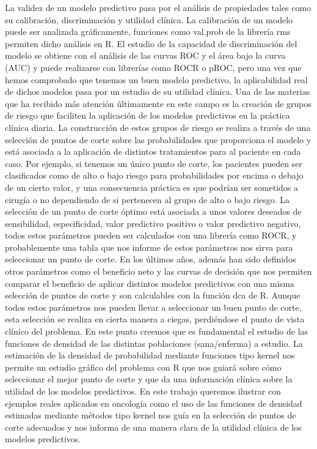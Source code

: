 La validez de un modelo predictivo pasa por el análisis de propiedades tales como su calibración, discriminación y utilidad clínica. 
La calibración de un modelo puede ser analizada gráficamente, funciones como val.prob  de la librería rms permiten dicho análisis en R. El estudio de la capacidad de discriminación del modelo se obtiene con el análisis de las curvas ROC y el área bajo la curva (AUC)  y puede realizarse con  librerías como ROCR o pROC, pero una vez que hemos comprobado que tenemos un buen modelo predictivo, la aplicabilidad real de dichos modelos pasa por un estudio de su utilidad clínica.
Una de las materias que ha recibido más atención últimamente en este campo es la creación de grupos de riesgo que faciliten la aplicación de los modelos predictivos  en la práctica clínica diaria. La construcción de estos grupos de riesgo se realiza a través de una selección de puntos de corte sobre las probabilidades que proporciona el modelo y está asociada a la aplicación de distintos tratamientos para al paciente en cada caso. Por ejemplo, si tenemos un único punto de corte, los pacientes pueden ser clasificados como de alto o bajo riesgo para probabilidades por encima o debajo de un cierto valor, y una consecuencia práctica es que podrían ser sometidos a cirugía o no dependiendo de si pertenecen al grupo de alto o bajo riesgo.  
La selección de un punto de corte óptimo está asociada a unos valores deseados de sensibilidad, especificidad, valor predictivo positivo o valor predictivo negativo, todos estos parámetros pueden ser calculados con una librería como ROCR, y probablemente una tabla que nos informe de estos parámetros nos sirva para seleccionar un punto de corte.  En los últimos años, además han sido definidos otros parámetros como  el beneficio neto y las curvas de decisión que nos permiten comparar el beneficio de aplicar distintos modelos predictivos con una misma selección de puntos de corte y son calculables con la función dca de R.
Aunque todos estos parámetros nos pueden llevar a seleccionar un buen punto de corte, esta selección se realiza en cierta manera a ciegas, perdiéndose el punto de vista clínico del problema. En este punto creemos que es fundamental el estudio de las funciones de densidad de las distintas poblaciones (sana/enferma) a estudio. La estimación de la densidad de probabilidad mediante funciones tipo kernel nos permite  un estudio gráfico del problema con R que nos guiará sobre cómo seleccionar el mejor punto de corte y que da una información clínica sobre la utilidad de los modelos predictivos.  
En este trabajo  queremos ilustrar con ejemplos reales aplicados en oncología como el uso de las funciones de densidad estimadas mediante métodos tipo kernel nos guía en la selección de puntos de corte adecuados y nos informa de una manera clara de la utilidad clínica de los modelos predictivos.

%

%
